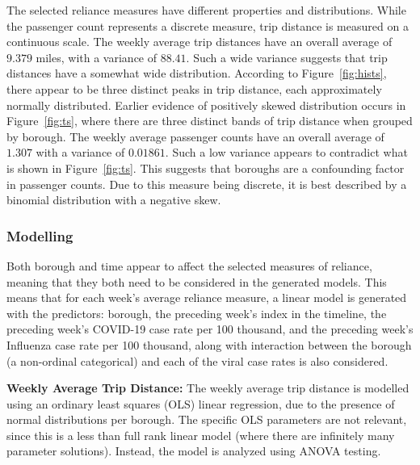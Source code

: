 \documentclass[11pt]{article}
\begin{document}
The selected reliance measures have different properties and distributions.
While the passenger count represents a discrete measure, trip distance is measured on a continuous scale.
The weekly average trip distances have an overall average of $9.379$ miles, with a variance of $88.41$.
Such a wide variance suggests that trip distances have a somewhat wide distribution.
According to Figure~\ref{fig:hists}, there appear to be three distinct peaks in trip distance,
each approximately normally distributed. 
Earlier evidence of positively skewed distribution occurs in Figure~\ref{fig:ts}, 
where there are three distinct bands of trip distance when grouped by borough.
The weekly average passenger counts have an overall average of $1.307$ with a variance of $0.01861$.
Such a low variance appears to contradict what is shown in Figure~\ref{fig:ts}.
This suggests that boroughs are a confounding factor in passenger counts.
Due to this measure being discrete, it is best described by a binomial distribution with a negative skew.

\subsubsection{Modelling}

Both borough and time appear to affect the selected measures of reliance,
meaning that they both need to be considered in the generated models.
This means that for each week's average reliance measure, 
a linear model is generated with the predictors: 
borough,
the preceding week's index in the timeline,
the preceding week's COVID-19 case rate per 100 thousand,
and
the preceding week's Influenza case rate per 100 thousand,
along with interaction between the borough (a non-ordinal categorical)
and each of the viral case rates is also considered.

\textbf{Weekly Average Trip Distance:}
The weekly average trip distance is modelled using an ordinary least squares (OLS) linear regression,
due to the presence of normal distributions per borough.
The specific OLS parameters are not relevant, since this is a less than full rank linear model (where there are infinitely many parameter solutions).
Instead, the model is analyzed using ANOVA testing.
\end{document}
